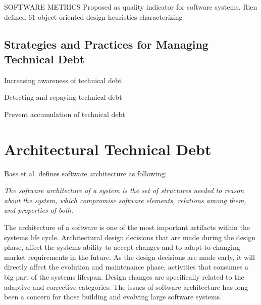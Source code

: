 SOFTWARE METRICS
Proposed as quality indicator for software systems. 
Rien defined 61 object-oriented design heuristics characterizing 


\subsection{Strategies and Practices for Managing Technical Debt}

Increasing awareness of technical debt

Detecting and repaying technical debt

Prevent accumulation of technical debt

























\section{Architectural Technical Debt}
Bass et al.\cite{Bass:2012:SAP:2392670} defines software architecture as following: 

\begin{displayquote}
\textit{The software architecture of a system is the set of structures needed to reason about the system, which compromise software elements, relations among them, and properties of both.}
\end{displayquote}

The architecture of a software is one of the most important artifacts within the systems life cycle\cite{Bass:2012:SAP:2392670,knodel2006static}. Architectural design decisions that are made during the design phase, affect the systems ability to accept changes and to adapt to changing market requirements in the future. As the design decisions are made early, it will directly affect the evolution and maintenance phase\cite{Pressman:2009:SEP:1593949}, activities that consumes a big part of the systems lifespan\cite{Vliet:2008:SEP:1481475}. Design changes are specifically related to the adaptive and corrective categories. The issues of software architecture has long been a concern for those building and evolving large software systems\cite{perry1997state}.




